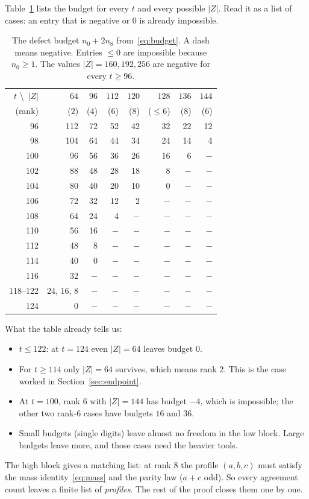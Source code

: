 \documentclass[11pt]{article}
\theoremstyle{definition}
\theoremstyle{remark}
\DeclareRobustCommand{\_}{\textunderscore\allowbreak}
\begin{document}
Table~\ref{tab:budget} lists the budget for every $t$ and every possible $|Z|$. Read it as a list of cases: an entry that is negative or $0$ is already impossible.

\begin{table}[ht]
\centering
\small
\begin{tabular}{@{}r|rrrrrrr@{}}
\toprule
$t$ \textbackslash\ $|Z|$ & $64$ & $96$ & $112$ & $120$ & $128$ & $136$ & $144$\\
(rank) & ($2$) & ($4$) & ($6$) & ($8$) & ($\le6$) & ($8$) & ($6$)\\
\midrule
96  & 112 & 72 & 52 & 42 & 32 & 22 & 12\\
98  & 104 & 64 & 44 & 34 & 24 & 14 & 4\\
100 & 96 & 56 & 36 & 26 & 16 & 6 & $-$\\
102 & 88 & 48 & 28 & 18 & 8 & $-$ & $-$\\
104 & 80 & 40 & 20 & 10 & 0 & $-$ & $-$\\
106 & 72 & 32 & 12 & 2 & $-$ & $-$ & $-$\\
108 & 64 & 24 & 4 & $-$ & $-$ & $-$ & $-$\\
110 & 56 & 16 & $-$ & $-$ & $-$ & $-$ & $-$\\
112 & 48 & 8 & $-$ & $-$ & $-$ & $-$ & $-$\\
114 & 40 & 0 & $-$ & $-$ & $-$ & $-$ & $-$\\
116 & 32 & $-$ & $-$ & $-$ & $-$ & $-$ & $-$\\
118--122 & 24, 16, 8 & $-$ & $-$ & $-$ & $-$ & $-$ & $-$\\
124 & 0 & $-$ & $-$ & $-$ & $-$ & $-$ & $-$\\
\bottomrule
\end{tabular}
\caption{The defect budget $n_0+2n_8$ from~\eqref{eq:budget}. A dash means negative. Entries $\le0$ are impossible because $n_0\ge1$. The values $|Z|=160,192,256$ are negative for every $t\ge96$.}
\label{tab:budget}
\end{table}

What the table already tells us:
\begin{itemize}[nosep]
  \item $t\le122$: at $t=124$ even $|Z|=64$ leaves budget $0$.
  \item For $t\ge114$ only $|Z|=64$ survives, which means rank $2$. This is the case worked in Section~\ref{sec:endpoint}.
  \item At $t=100$, rank $6$ with $|Z|=144$ has budget $-4$, which is impossible; the other two rank-$6$ cases have budgets $16$ and $36$.
  \item Small budgets (single digits) leave almost no freedom in the low block. Large budgets leave more, and those cases need the heavier tools.
\end{itemize}
The high block gives a matching list: at rank $8$ the profile $(a,b,c)$ must satisfy the mass identity~\eqref{eq:mass} and the parity law ($a+c$ odd). So every agreement count leaves a finite list of \emph{profiles}. The rest of the proof closes them one by one.
\end{document}
